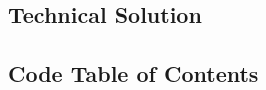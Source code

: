\begin{flushleft}
    \section{Technical Solution} 

    \subsection{Code Table of Contents}
    

\end{flushleft}